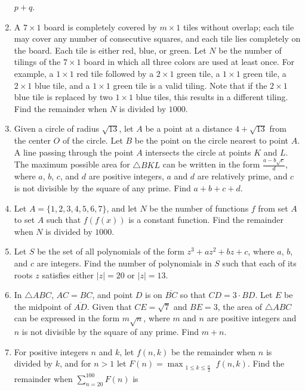 \documentclass{article}
\begin{document}
\begin{enumerate}[label=\arabic*., itemsep=0.5em]
\(p+q\).\par \vspace{0.5em}\item A \(7\times 1\) board is completely covered by \(m\times 1\) tiles without overlap; each tile may cover any number of consecutive squares, and each tile lies completely on the board. Each tile is either red, blue, or green. Let \(N\) be the number of tilings of the \(7\times 1\) board in which all three colors are used at least once. For example, a \(1\times 1\) red tile followed by a \(2\times 1\) green tile, a \(1\times 1\) green tile, a \(2\times 1\) blue tile, and a \(1\times 1\) green tile is a valid tiling. Note that if the \(2\times 1\) blue tile is replaced by two \(1\times 1\) blue tiles, this results in a different tiling. Find the remainder when \(N\) is divided by \(1000\).\par \vspace{0.5em}\item Given a circle of radius \(\sqrt{13}\), let \(A\) be a point at a distance \(4 + \sqrt{13}\) from the center \(O\) of the circle. Let \(B\) be the point on the circle nearest to point \(A\). A line passing through the point \(A\) intersects the circle at points \(K\) and \(L\). The maximum possible area for \(\triangle BKL\) can be written in the form \(\frac{a - b\sqrt{c}}{d}\), where \(a\), \(b\), \(c\), and \(d\) are positive integers, \(a\) and \(d\) are relatively prime, and \(c\) is not divisible by the square of any prime. Find \(a+b+c+d\).\par \vspace{0.5em}\item Let \(A = \{1, 2, 3, 4, 5, 6, 7\}\), and let \(N\) be the number of functions \(f\) from set \(A\) to set \(A\) such that \(f(f(x))\) is a constant function. Find the remainder when \(N\) is divided by \(1000\).\par \vspace{0.5em}\item Let \(S\) be the set of all polynomials of the form \(z^3 + az^2 + bz + c\), where \(a\), \(b\), and \(c\) are integers. Find the number of polynomials in \(S\) such that each of its roots \(z\) satisfies either \(|z| = 20\) or \(|z| = 13\).\par \vspace{0.5em}\item In \(\triangle ABC\), \(AC = BC\), and point \(D\) is on \(\overline{BC}\) so that \(CD = 3\cdot BD\). Let \(E\) be the midpoint of \(\overline{AD}\). Given that \(CE = \sqrt{7}\) and \(BE = 3\), the area of \(\triangle ABC\) can be expressed in the form \(m\sqrt{n}\), where \(m\) and \(n\) are positive integers and \(n\) is not divisible by the square of any prime. Find \(m+n\).\par \vspace{0.5em}\item For positive integers \(n\) and \(k\), let \(f(n, k)\) be the remainder when \(n\) is divided by \(k\), and for \(n > 1\) let \(F(n) = \max_{\substack{1\le k\le \frac{n}{2}}} f(n, k)\). Find the remainder when \(\sum\limits_{n=20}^{100} F(n)\) is 
\end{enumerate}
\end{document}
